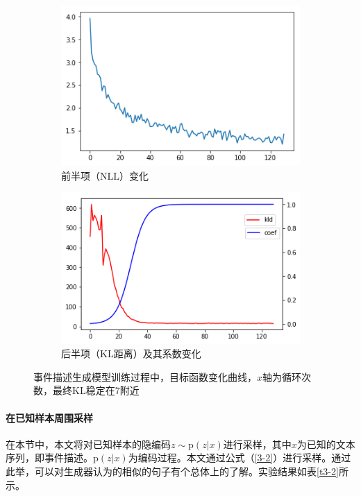 \begin{figure}[htb]
    \centering
	\begin{subfigure}{.4\textwidth}
		\includegraphics[width=\textwidth]{ce.png}
		\caption{前半项（$\mathrm{NLL}$）变化}
	\end{subfigure}
	\begin{subfigure}{.425\textwidth}
		\includegraphics[width=\textwidth]{ceof.png}
		\caption{后半项（$\mathrm{KL}$距离）及其系数变化}
    \end{subfigure}
    \caption{事件描述生成模型训练过程中，目标函数变化曲线，$x$轴为循环次数，最终$\mathrm{KL}$稳定在7附近}
    \label{f3-2}
\end{figure}

\paragraph{在已知样本周围采样}  
在本节中，本文将对已知样本的隐编码$z \sim \mathrm{p}(z|x)$进行采样，其中$x$为已知的文本序列，即事件描述。$\mathrm{p}(z|x)$为编码过程。本文通过公式（\ref{3-2}）进行采样。通过此举，可以对生成器认为的相似的句子有个总体上的了解。实验结果如表\ref{t3-2}所示。 

